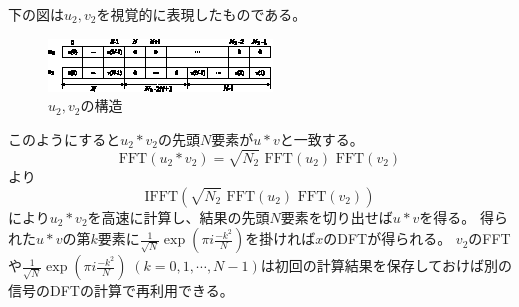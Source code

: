 			下の図は$u_2,v_2$を視覚的に表現したものである。
			\begin{figure}[H]
				\centering
				\includegraphics[keepaspectratio, scale=4]
				{parts/FourierAnalysis/imgs/FFT/arbitraryLengthFFT_to_powerOf2_FFT/u2,v2.eps}
				\caption{$u_2,v_2$の構造}
			\end{figure}
			このようにすると$u_2*v_2$の先頭$N$要素が$u*v$と一致する。
			\[ \text{FFT}(u_2*v_2) = \sqrt{N_2}\text{ FFT}(u_2) \text{ FFT}(v_2) \]
			より
			\[ \text{IFFT}(\sqrt{N_2}\text{ FFT}(u_2) \text{ FFT}(v_2)) \]
			により$u_2*v_2$を高速に計算し、結果の先頭$N$要素を切り出せば$u*v$を得る。
			得られた$u*v$の第$k$要素に$\frac{1}{\sqrt{N}} \exp \left(\pi i\frac{-k^2}{N}\right)$を掛ければ$x$のDFTが得られる。
			$v_2$のFFTや$\frac{1}{\sqrt{N}} \exp \left(\pi i\frac{-k^2}{N}\right) \;(k=0,1,\cdots,N-1)$は初回の計算結果を保存しておけば別の信号のDFTの計算で再利用できる。

